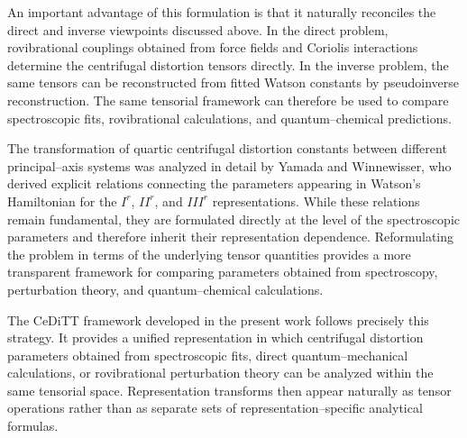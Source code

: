 An important advantage of this formulation is that it naturally
reconciles the direct and inverse viewpoints discussed above. In the
direct problem, rovibrational couplings obtained from force fields and
Coriolis interactions determine the centrifugal distortion tensors
directly. In the inverse problem, the same tensors can be reconstructed
from fitted Watson constants by pseudoinverse reconstruction. The
same tensorial framework can therefore be used to compare spectroscopic
fits, rovibrational calculations, and quantum--chemical predictions.

The transformation of quartic centrifugal distortion constants between
different principal--axis systems was analyzed in detail by Yamada and
Winnewisser,\cite{Yamada1976} who derived explicit relations connecting
the parameters appearing in Watson's Hamiltonian for the $I^r$, $II^r$,
and $III^r$ representations. While these relations remain fundamental,
they are formulated directly at the level of the spectroscopic
parameters and therefore inherit their representation dependence.
Reformulating the problem in terms of the underlying tensor quantities
provides a more transparent framework for comparing parameters
obtained from spectroscopy, perturbation theory, and
quantum--chemical calculations.\cite{Kirschner1983}

The CeDiTT framework developed in the present work follows precisely
this strategy. It provides a unified representation in which
centrifugal distortion parameters obtained from spectroscopic fits,
direct quantum--mechanical calculations, or rovibrational perturbation
theory can be analyzed within the same tensorial space. Representation
transforms then appear naturally as tensor operations rather than as
separate sets of representation--specific analytical formulas.
